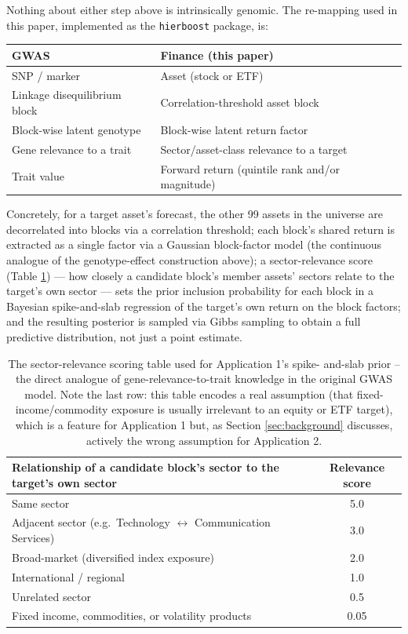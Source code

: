 \documentclass[11pt]{article}
\begin{document}
Nothing about either step above is intrinsically genomic. The re-mapping used
in this paper, implemented as the \texttt{hierboost} package, is:

\begin{center}
\begin{tabular}{@{}ll@{}}
\toprule
GWAS & Finance (this paper) \\
\midrule
SNP / marker & Asset (stock or ETF) \\
Linkage disequilibrium block & Correlation-threshold asset block \\
Block-wise latent genotype & Block-wise latent return factor \\
Gene relevance to a trait & Sector/asset-class relevance to a target \\
Trait value & Forward return (quintile rank and/or magnitude) \\
\bottomrule
\end{tabular}
\end{center}

Concretely, for a target asset's forecast, the other 99 assets in the universe
are decorrelated into blocks via a correlation threshold; each block's shared
return is extracted as a single factor via a Gaussian block-factor model
(the continuous analogue of the genotype-effect construction above); a
sector-relevance score (Table \ref{tab:relevance}) --- how closely a candidate
block's member assets' sectors relate to the target's own sector --- sets the
prior inclusion probability for each block in a Bayesian spike-and-slab
regression of the target's own return on the block factors; and the resulting
posterior is sampled via Gibbs sampling to obtain a full predictive
distribution, not just a point estimate.

\begin{table}[htbp]
\centering
\begin{tabular}{@{}lc@{}}
\toprule
Relationship of a candidate block's sector to the target's own sector & Relevance score \\
\midrule
Same sector                                   & 5.0 \\
Adjacent sector (e.g.\ Technology $\leftrightarrow$ Communication Services) & 3.0 \\
Broad-market (diversified index exposure)     & 2.0 \\
International / regional                      & 1.0 \\
Unrelated sector                               & 0.5 \\
Fixed income, commodities, or volatility products & 0.05 \\
\bottomrule
\end{tabular}
\caption{The sector-relevance scoring table used for Application 1's spike-
and-slab prior -- the direct analogue of gene-relevance-to-trait knowledge in
the original GWAS model. Note the last row: this table encodes a real
assumption (that fixed-income/commodity exposure is usually irrelevant to an
equity or ETF target), which is a feature for Application 1 but, as Section
\ref{sec:background} discusses, actively the wrong assumption for
Application 2.}
\label{tab:relevance}
\end{table}
\end{document}
